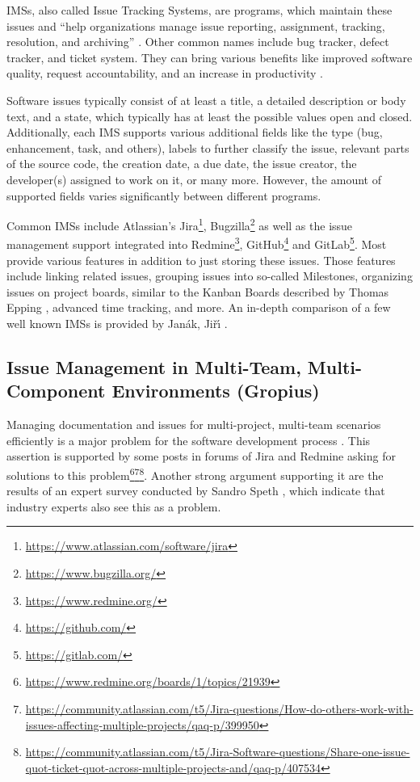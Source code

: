 \glspl{IMS}, also called Issue Tracking Systems, are programs, which maintain these issues
and ``help organizations manage issue reporting, assignment, tracking, resolution, and archiving'' \cite{bertram2010communication}.
Other common names include bug tracker, defect tracker, and ticket system.
They can bring various benefits like improved software quality, request accountability, and
an increase in productivity \cite{janak2009issue}. 

Software issues typically consist of at least a title, a detailed description or body text, and a state, 
which typically has at least the possible values open and closed.
Additionally, each \gls{IMS} supports various additional fields like the type (bug, enhancement, task, and others), 
labels to further classify the issue, relevant parts of the source code, the creation date, a due date, the issue creator, the developer(s) assigned to work on it, or many more.
However, the amount of supported fields varies significantly between different programs.

Common \glspl{IMS} include Atlassian's Jira\footnote{\url{https://www.atlassian.com/software/jira}}, 
Bugzilla\footnote{\url{https://www.bugzilla.org/}} 
as well as the issue management support integrated into Redmine\footnote{\url{https://www.redmine.org/}}, 
GitHub\footnote{\url{https://github.com/}} and 
GitLab\footnote{\url{https://gitlab.com/}}.
Most provide various features in addition to just storing these issues. 
Those features include linking related issues, grouping issues into so-called Milestones, organizing issues on project boards, similar to the Kanban Boards described by Thomas Epping \cite{epping2011kanban}, advanced time tracking, and more.
An in-depth comparison of a few well known \glspl{IMS} is provided by Jan{\'a}k, Ji{\v{r}}{\'\i} \cite{janak2009issue}. 

\subsection{Issue Management in Multi-Team, Multi-Component Environments (Gropius)}
\label{ssec:ch2:ss1.2}
Managing documentation and issues for multi-project, multi-team scenarios efficiently is a major problem for the software development process  \cite{mahmood2015identifying}. This assertion is supported by some posts in forums of Jira and Redmine asking for solutions to this problem\footnote{\url{https://www.redmine.org/boards/1/topics/21939}}\footnote{\url{https://community.atlassian.com/t5/Jira-questions/How-do-others-work-with-issues-affecting-multiple-projects/qaq-p/399950}}\footnote{\url{https://community.atlassian.com/t5/Jira-Software-questions/Share-one-issue-quot-ticket-quot-across-multiple-projects-and/qaq-p/407534}}. Another strong argument supporting it are the results of an expert survey conducted by Sandro Speth \cite{Speth2019}, which indicate that industry experts also see this as a problem.


